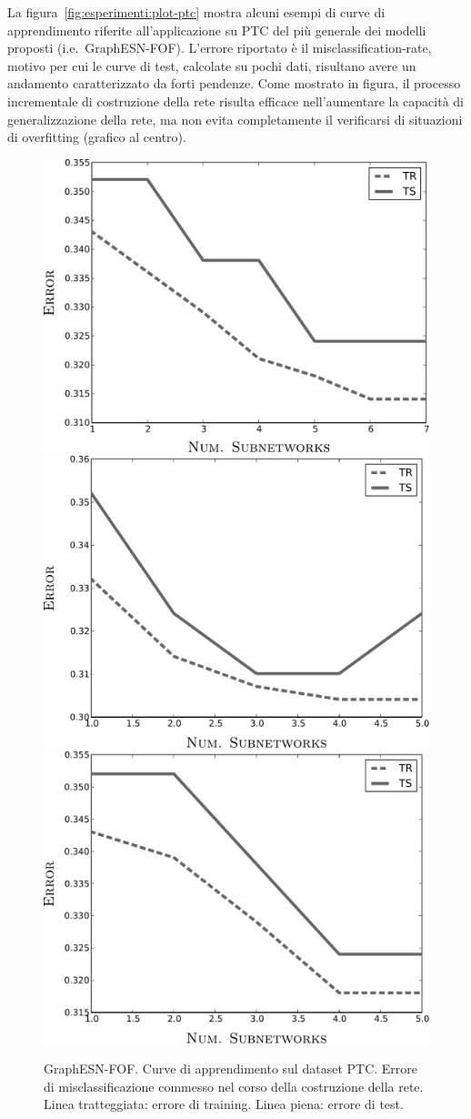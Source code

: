 La figura~\vref{fig:esperimenti:plot-ptc} mostra alcuni esempi di curve di apprendimento riferite all'applicazione su PTC del più generale dei modelli proposti (i.e.\ GraphESN-FOF). L'errore riportato è il misclassification-rate, motivo per cui le curve di test, calcolate su pochi dati, risultano avere un andamento caratterizzato da forti pendenze. Come mostrato in figura, il processo incrementale di costruzione della rete risulta efficace nell'aumentare la capacità di generalizzazione della rete, ma non evita completamente il verificarsi di situazioni di overfitting (grafico al centro).
\begin{figure}[p]
\centering
\includegraphics[width=0.5\columnwidth]{img/plot/ptc1}\\
\vspace*{0.8cm}
\includegraphics[width=0.5\columnwidth]{img/plot/ptc2}\\
\vspace*{0.8cm}
\includegraphics[width=0.5\columnwidth]{img/plot/ptc3}\\
\medskip
\caption[PTC: curve di apprendimento.]{GraphESN-FOF. Curve di apprendimento sul dataset PTC. Errore di misclassificazione commesso nel corso della costruzione della rete.\\
Linea tratteggiata: errore di training. Linea piena: errore di test.}
\label{fig:esperimenti:plot-ptc}
\end{figure}


